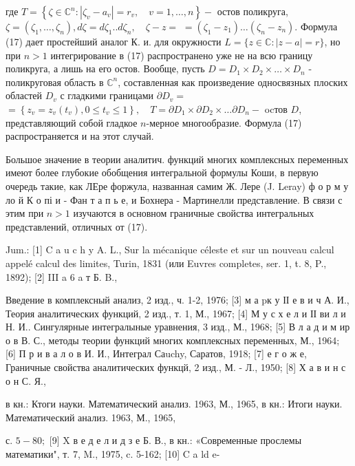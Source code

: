 \documentclass[10pt]{article}
\begin{document}
где $T=\left\{\zeta \in \mathbb{C}^{n}:\left|\zeta_{v}-a_{v}\right|=r_{v}, \quad v=1, \ldots, n\right\}-$ остов поликруга, $\zeta=\left(\zeta_{1}, \ldots, \zeta_{n}\right), d \zeta=d \zeta_{1} . . d \zeta_{n}, \quad \zeta-z=$ $=\left(\zeta_{1}-z_{1}\right) \ldots\left(\zeta_{n}-z_{n}\right)$. Формула (17) дает простейший аналог К. и. для окружности $L=\{z \in \mathbb{C}:|z-a|=r\}$, но при $n>1$ интегрирование в (17) распространено уже не на всю границу поликруга, а лишь на его остов. Вообще, пусть $D=D_{1} \times D_{2} \times \ldots \times D_{n}$ - поликруговая область в $\mathbb{C}^{n}$, составленная как произведение односвязных плоских областей $D_{v}$ с гладкими границами $\partial D_{v}=$ $=\left\{z_{v}=z_{v}\left(t_{v}\right), 0 \leqslant t_{v} \leqslant 1\right\}, \quad T=\partial D_{1} \times \partial D_{2} \times \ldots \partial D_{n}-$ ocтов $D$, представляющий собой гладкое $n$-мерное многообразие. Формула (17) распространяется и на этот случай.



Большое значение в теории аналитич. функций многих комплексных переменных имеют более глубокие обобщения интегральной формулы Коши, в первую очередь такие, как ЛЕре форжула, названная самим Ж. Лере (J. Leray) ф о р м у ло й К о пі и - Фан т а п ь е, и Бохнера - Мартинелли представление. В связи с этим при $n>1$ изучаются в основном граничные свойства интегральных представлений, отличных от (17).



Jum.: [1] C a u c h y A. L., Sur la mécanique céleste et sur un nouveau calcul appelé calcul des limites, Turin, 1831 (или Euvres completes, ser. 1, t. 8, P., 1892); [2] III a 6 a т Б. B.,

Введение в комплексный анализ, 2 изд., ч. 1-2, 1976; [3] м а pк у ІІ е в и ч А. И., Теория аналитических функций, 2 изд., т. 1, М., 1967; [4] М у с х е л и ІІ ви л и Н. И.. Сингулярные интегралыные уравнения, 3 изд., М., 1968; [5] В л а д и м ир о в В. С., методы теории функций многих комплексных переменных, М., 1964; [6] П р и в а л о в И. И., Интеграл Саuchy, Саратов, 1918; [7] е г о ж е, Граничные свойства аналитических функцй, 2 изд., М. - Л., 1950; [8] Х а в и н с о н С. Я.,

в кн.: Ктоги науки. Математический анализ. 1963, М., 1965, в кн.: Итоги науки. Математический анализ. 1963, М., 1965,

с. $5-80 ;$ [9] X в е д е л и д з е Б. В., в кн.: «Современные прослемы математики", т. 7, M., 1975, c. 5-162; [10] C a ld e-
\end{document}
